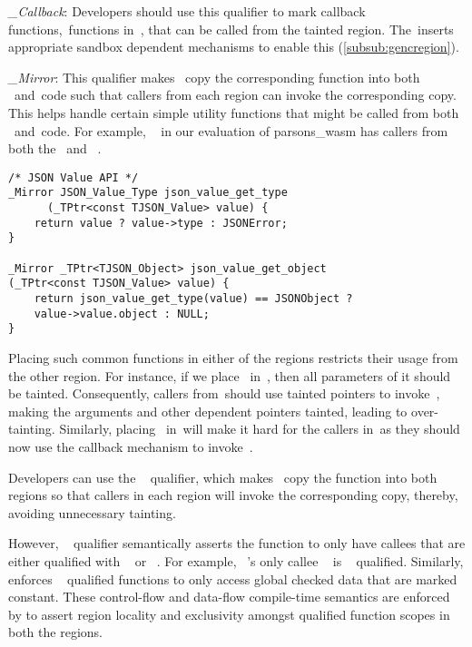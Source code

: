 \noindent\emph{\_Callback}:
Developers should use this qualifier to mark callback functions,~\ie functions in~\cregion, that can be called from the tainted region. 
The~\sourcerewriter inserts appropriate sandbox dependent mechanisms to enable this (\ref{subsub:gencregion}).

\noindent\emph{\_Mirror}: 
This qualifier makes ~\sourcerewriter copy the corresponding function into both ~\cregion and~\ucregion code such that callers from each region can invoke the corresponding copy.
This helps handle certain simple utility functions that might be called from both ~\cregion and~\ucregion code. For example, ~ in our evaluation of parsons\_wasm has callers from both the ~\cregion and ~\ucregion. 
\begin{verbatim}
/* JSON Value API */
_Mirror JSON_Value_Type json_value_get_type  
      (_TPtr<const TJSON_Value> value) {
    return value ? value->type : JSONError;
}

_Mirror _TPtr<TJSON_Object> json_value_get_object
(_TPtr<const TJSON_Value> value) {
    return json_value_get_type(value) == JSONObject ?
    value->value.object : NULL;
}

\end{verbatim}

Placing such common functions in either of the regions restricts their usage from the other region. For instance, if we place~ in~\ucregion, then all parameters of it should be tainted. Consequently, callers from~\cregion should use tainted pointers to invoke~, making the arguments and other dependent pointers tainted, leading to over-tainting.
Similarly, placing~ in~\cregion will make it hard for the callers in~\ucregion as they should now use the callback mechanism to invoke~.

Developers can use the ~ qualifier, which makes ~\sourcerewriter copy the function into both regions so that callers in each region will invoke the corresponding copy, thereby, avoiding unnecessary tainting. 

However, ~ qualifier semantically asserts the function to only have callees that are either qualified with ~ or ~. For example, ~'s only callee 
\newline
~ is ~ qualified.
Similarly, \systemname enforces ~ qualified functions to only access global checked data that are marked constant. These control-flow and data-flow compile-time semantics are enforced by \systemname to assert region locality and exclusivity amongst qualified function scopes in both the regions.   

